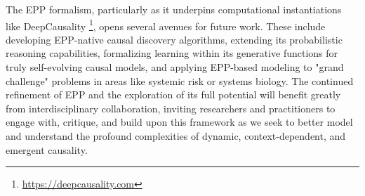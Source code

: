 The EPP formalism, particularly as it underpins computational instantiations like DeepCausality \footnote{\url{https://deepcausality.com}}, opens several avenues for future work. These include developing EPP-native causal discovery algorithms, extending its probabilistic reasoning capabilities, formalizing learning within its generative functions for truly self-evolving causal models, and applying EPP-based modeling to "grand challenge" problems in areas like systemic risk or systems biology. The continued refinement of EPP and the exploration of its full potential will benefit greatly from interdisciplinary collaboration, inviting researchers and practitioners to engage with, critique, and build upon this framework as we seek to better model and understand the profound complexities of dynamic, context-dependent, and emergent causality.

\newpage